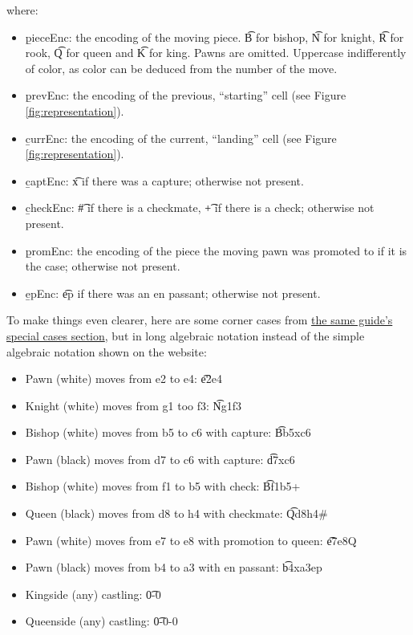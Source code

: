 \noindent where:
\begin{itemize}
    \item \b{pieceEnc}: the encoding of the moving piece. \t{B} for bishop, \t{N} for knight, \t{R} for rook, \t{Q} for queen and \t{K} for king. Pawns are omitted. Uppercase indifferently of color, as color can be deduced from the number of the move.
    \item \b{prevEnc}: the encoding of the previous, ``starting'' cell (see Figure \ref{fig:representation}).
    \item \b{currEnc}: the encoding of the current, ``landing'' cell (see Figure \ref{fig:representation}).
    \item \b{captEnc}: \t{x} if there was a capture; otherwise not present.
    \item \b{checkEnc}: \t{\#} if there is a checkmate, \t{+} if there is a check; otherwise not present.
    \item \b{promEnc}: the encoding of the piece the moving pawn was promoted to if it is the case; otherwise not present.
    \item \b{epEnc}: \t{ep} if there was an en passant; otherwise not present.
\end{itemize}
\vspace{0.5cm}

To make things even clearer, here are some corner cases from \href{https://www.chess.com/terms/chess-notation#specialcases}{the same guide's special cases section}, but in long algebraic notation instead of the simple algebraic notation shown on the website:

\begin{itemize}
    \item Pawn (white) moves from e2 to e4:                         \t{e2e4}
    \item Knight (white) moves from g1 too f3:                      \t{Ng1f3}
    \item Bishop (white) moves from b5 to c6 with capture:          \t{Bb5xc6}
    \item Pawn (black) moves from d7 to c6 with capture:            \t{d7xc6}
    \item Bishop (white) moves from f1 to b5 with check:            \t{Bf1b5+}
    \item Queen (black) moves from d8 to h4 with checkmate:         \t{Qd8h4\#}
    \item Pawn (white) moves from e7 to e8 with promotion to queen: \t{e7e8Q}
    \item Pawn (black) moves from b4 to a3 with en passant:         \t{b4xa3ep}
    \item Kingside (any) castling:                                  \t{0-0}
    \item Queenside (any) castling:                                 \t{0-0-0}
\end{itemize}
\vspace{0.5cm}


